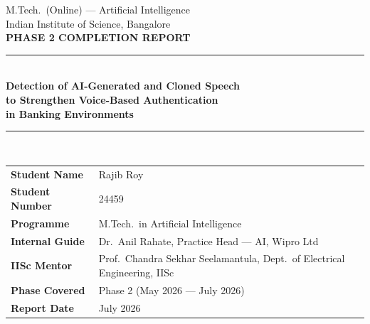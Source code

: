 \documentclass[12pt,a4paper]{report}
\begin{document}

\begin{titlepage}
  \thispagestyle{empty}
  \begin{center}
    \vspace*{1cm}
    {\large\color{darkblue}M.Tech.\ (Online) --- Artificial Intelligence}\\[4pt]
    {\large\color{darkblue}Indian Institute of Science, Bangalore}\\[2cm]
    {\Huge\bfseries\color{darkblue}PHASE 2 COMPLETION REPORT}\\[1cm]
    {\color{medblue}\rule{\linewidth}{2pt}}\\[0.5cm]
    {\LARGE\bfseries\color{medblue}
      Detection of AI-Generated and Cloned Speech\\[6pt]
      to Strengthen Voice-Based Authentication\\[6pt]
      in Banking Environments}\\[0.4cm]
    {\color{medblue}\rule{\linewidth}{1pt}}\\[1.8cm]
    \begin{tabular}{@{}L{4.5cm}L{9cm}@{}}
      \textbf{Student Name}   & Rajib Roy \\
          \textbf{Student Number} & 24459 \\
      \textbf{Programme}      & M.Tech.\ in Artificial Intelligence \\
          \textbf{Internal Guide} & Dr.\ Anil Rahate, Practice Head --- AI, Wipro Ltd \\
      \textbf{IISc Mentor}    & Prof.\ Chandra Sekhar Seelamantula,
                                                     Dept.\ of Electrical Engineering, IISc \\
          \textbf{Phase Covered}  & Phase 2 \quad (May 2026 --- July 2026) \\
      \textbf{Report Date}    & July 2026 \\
    \end{tabular}
  \end{center}
\end{titlepage}

\tableofcontents
\listoffigures
\clearpage
{}

\end{document}
